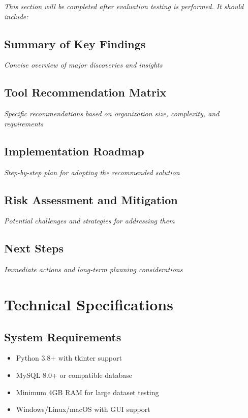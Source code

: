 \documentclass[11pt,a4paper]{article}
\begin{document}
\textit{This section will be completed after evaluation testing is performed. It should include:}

\subsection{Summary of Key Findings}
\textit{Concise overview of major discoveries and insights}

\subsection{Tool Recommendation Matrix}
\textit{Specific recommendations based on organization size, complexity, and requirements}

\subsection{Implementation Roadmap}
\textit{Step-by-step plan for adopting the recommended solution}

\subsection{Risk Assessment and Mitigation}
\textit{Potential challenges and strategies for addressing them}

\subsection{Next Steps}
\textit{Immediate actions and long-term planning considerations}

\newpage
\appendix

\section{Technical Specifications}

\subsection{System Requirements}
\begin{itemize}
\item Python 3.8+ with tkinter support
\item MySQL 8.0+ or compatible database
\item Minimum 4GB RAM for large dataset testing
\item Windows/Linux/macOS with GUI support
\end{itemize}
\end{document}
